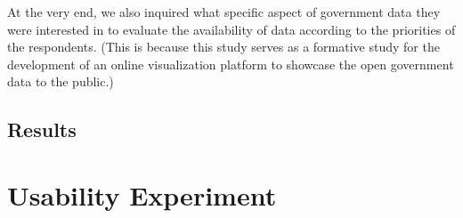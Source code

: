 \documentclass{sigchi}
\begin{document}
At the very end, we also inquired what specific aspect of government data they were interested in to evaluate the availability of data according to the priorities of the respondents. (This is because this study serves as a formative study for the development of an online visualization platform to showcase the open government data to the public.)

\subsection{Results}


\section{Usability Experiment}

\end{document}
